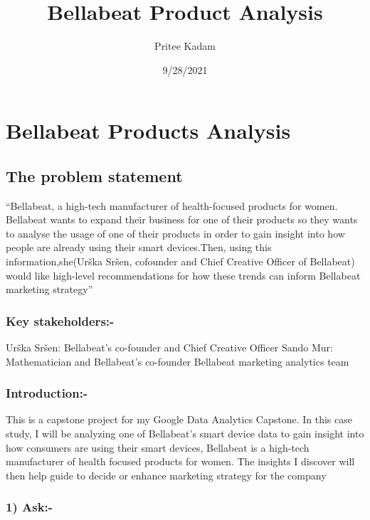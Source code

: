 \documentclass[
]{article}
\title{Bellabeat Product Analysis}
\author{Pritee Kadam}
\date{9/28/2021}
\begin{document}
\maketitle

\hypertarget{bellabeat-products-analysis}{%
\section{Bellabeat Products
Analysis}\label{bellabeat-products-analysis}}

\hypertarget{the-problem-statement}{%
\subsection{The problem statement}\label{the-problem-statement}}

``Bellabeat, a high-tech manufacturer of health-focused products for
women. Bellabeat wants to expand their business for one of their
products so they wants to analyse the usage of one of their products in
order to gain insight into how people are already using their smart
devices.Then, using this information,she(Urška Sršen, cofounder and
Chief Creative Officer of Bellabeat) would like high-level
recommendations for how these trends can inform Bellabeat marketing
strategy''

\hypertarget{key-stakeholders-}{%
\subsubsection{Key stakeholders:-}\label{key-stakeholders-}}

Urška Sršen: Bellabeat's co-founder and Chief Creative Officer Sando
Mur: Mathematician and Bellabeat's co-founder Bellabeat marketing
analytics team

\hypertarget{introduction-}{%
\subsubsection{Introduction:-}\label{introduction-}}

This is a capstone project for my Google Data Analytics Capstone. In
this case study, I will be analyzing one of Bellabeat's smart device
data to gain insight into how consumers are using their smart devices,
Bellabeat is a high-tech manufacturer of health focused products for
women. The insights I discover will then help guide to decide or enhance
marketing strategy for the company

\hypertarget{ask-}{%
\subsubsection{1) Ask:-}\label{ask-}}
\end{document}
